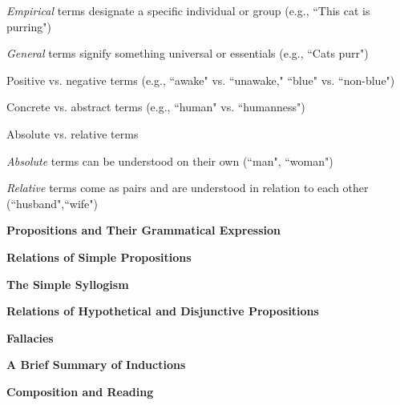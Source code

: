 \documentclass{report}
\begin{document}
\begin{outline}
\begin{outline}
      \begin{outline}
      \item \textit{Empirical} terms designate a specific individual or group (e.g., ``This cat is purring")
      \item \textit{General} terms signify something universal or essentials (e.g., ``Cats purr")
      \end{outline}
      \item Positive vs. negative terms (e.g., ``awake" vs. ``unawake," ``blue" vs. ``non-blue")
      \item Concrete vs. abstract terms (e.g., ``human" vs. ``humanness")
      \item Absolute vs. relative terms
        \begin{outline}
          \item \textit{Absolute} terms can be understood on their own (``man", ``woman")
          \item \textit{Relative} terms come as pairs and are understood in relation to each other (``husband",``wife")
          \end{outline}
    \end{outline}
  \item {\bf Propositions and Their Grammatical Expression}
  \item {\bf Relations of Simple Propositions}
  \item {\bf The Simple Syllogism}
  \item {\bf Relations of Hypothetical and Disjunctive Propositions}
  \item {\bf Fallacies}
  \item {\bf A Brief Summary of Inductions}
  \item {\bf Composition and Reading}
\end{outline}
\end{document}
